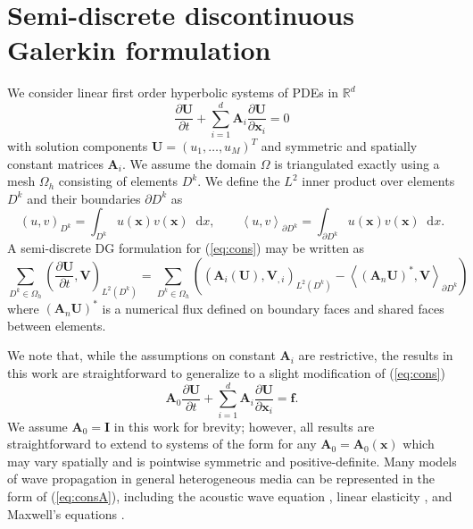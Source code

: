 \documentclass[preprint,10pt]{elsarticle}
\newcommand{\pd}[2]{\frac{\partial#1}{\partial#2}}
\newcommand{\LRp}[1]{\left( #1 \right)}
\newcommand{\LRa}[1]{\left\langle #1 \right\rangle}
\newcommand{\Lk}{L^2\LRp{D^k}}
\newcommand{\Oh}{\Omega_h}
\newcommand*\diff[1]{\mathop{}\!{\mathrm{d}#1}}
\begin{document}
\section{Semi-discrete discontinuous Galerkin formulation}

We consider linear first order hyperbolic systems of PDEs in $\mathbb{R}^d$
\begin{equation}
\pd{\bm{U}}{t} + \sum_{i=1}^d \bm{A}_i\pd{{\bm{U}}}{\bm{x}_i} = 0
\label{eq:cons}
\end{equation}
with solution components $\bm{U} = (u_1, \ldots, u_M)^T$ and symmetric and spatially constant matrices $\bm{A}_i$.  We assume the domain $\Omega$ is triangulated exactly using a mesh $\Oh$ consisting of elements $D^k$.  We define the $L^2$ inner product over elements $D^k$ and their boundaries $\partial D^k$ as
\[
\LRp{u,v}_{D^k} = \int_{D^k} u(\bm{x})v(\bm{x}) \diff x, \qquad \LRa{u,v}_{\partial D^k} = \int_{\partial D^k} u(\bm{x})v(\bm{x}) \diff x.
\]
A semi-discrete DG formulation for (\ref{eq:cons}) may be written as 
\begin{equation}
\sum_{D^k \in \Oh} \LRp{\pd{\bm{U}}{t},\bm{V} }_{\Lk} = \sum_{D^k \in \Oh}\LRp{ \LRp{\bm{A}_i(\bm{U}), \bm{V}_{,i}}_{\Lk} - \LRa{(\bm{A}_n\bm{U})^*,\bm{V}}_{\partial D^k}}
\label{eq:formulation}
\end{equation}
where $(\bm{A}_n\bm{U})^*$ is a numerical flux defined on boundary faces and shared faces between elements.  

We note that, while the assumptions on constant $\bm{A}_i$ are restrictive, the results in this work are straightforward to generalize to a slight modification of (\ref{eq:cons})
\begin{equation}
\bm{A}_0\pd{\bm{U}}{t} + \sum_{i=1}^d \bm{A}_i\pd{{\bm{U}}}{\bm{x}_i} = \bm{f}.
\label{eq:consA}
\end{equation}
We assume $\bm{A}_0 = \bm{I}$ in this work for brevity; however, all results are straightforward to extend to systems of the form for any $\bm{A}_0 = \bm{A}_0(\bm{x})$ which may vary spatially and is pointwise symmetric and positive-definite.  Many models of wave propagation in general heterogeneous media can be represented in the form of (\ref{eq:consA}), including the acoustic wave equation \cite{chan2016weight1}, linear elasticity \cite{de2008interior,wilcox2010high,ye2016discontinuous}, and Maxwell's equations \cite{hesthaven2002nodal,hesthaven2004high,grote2007interior,warburton2013low}.  %
\end{document}
